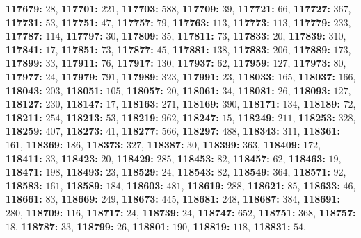 \textsf{\bfseries 117679:} $28$, \textsf{\bfseries 117701:} $221$, \textsf{\bfseries 117703:} $588$, \textsf{\bfseries 117709:} $39$, \textsf{\bfseries 117721:} $66$, \textsf{\bfseries 117727:} $367$, \textsf{\bfseries 117731:} $53$, \textsf{\bfseries 117751:} $47$, \textsf{\bfseries 117757:} $79$, \textsf{\bfseries 117763:} $113$, \textsf{\bfseries 117773:} $113$, \textsf{\bfseries 117779:} $233$, \textsf{\bfseries 117787:} $114$, \textsf{\bfseries 117797:} $30$, \textsf{\bfseries 117809:} $35$, \textsf{\bfseries 117811:} $73$, \textsf{\bfseries 117833:} $20$, \textsf{\bfseries 117839:} $310$, \textsf{\bfseries 117841:} $17$, \textsf{\bfseries 117851:} $73$, \textsf{\bfseries 117877:} $45$, \textsf{\bfseries 117881:} $138$, \textsf{\bfseries 117883:} $206$, \textsf{\bfseries 117889:} $173$, \textsf{\bfseries 117899:} $33$, \textsf{\bfseries 117911:} $76$, \textsf{\bfseries 117917:} $130$, \textsf{\bfseries 117937:} $62$, \textsf{\bfseries 117959:} $127$, \textsf{\bfseries 117973:} $80$, \textsf{\bfseries 117977:} $24$, \textsf{\bfseries 117979:} $791$, \textsf{\bfseries 117989:} $323$, \textsf{\bfseries 117991:} $23$, \textsf{\bfseries 118033:} $165$, \textsf{\bfseries 118037:} $166$, \textsf{\bfseries 118043:} $203$, \textsf{\bfseries 118051:} $105$, \textsf{\bfseries 118057:} $20$, \textsf{\bfseries 118061:} $34$, \textsf{\bfseries 118081:} $26$, \textsf{\bfseries 118093:} $127$, \textsf{\bfseries 118127:} $230$, \textsf{\bfseries 118147:} $17$, \textsf{\bfseries 118163:} $271$, \textsf{\bfseries 118169:} $390$, \textsf{\bfseries 118171:} $134$, \textsf{\bfseries 118189:} $72$, \textsf{\bfseries 118211:} $254$, \textsf{\bfseries 118213:} $53$, \textsf{\bfseries 118219:} $962$, \textsf{\bfseries 118247:} $15$, \textsf{\bfseries 118249:} $211$, \textsf{\bfseries 118253:} $328$, \textsf{\bfseries 118259:} $407$, \textsf{\bfseries 118273:} $41$, \textsf{\bfseries 118277:} $566$, \textsf{\bfseries 118297:} $488$, \textsf{\bfseries 118343:} $311$, \textsf{\bfseries 118361:} $161$, \textsf{\bfseries 118369:} $186$, \textsf{\bfseries 118373:} $327$, \textsf{\bfseries 118387:} $30$, \textsf{\bfseries 118399:} $363$, \textsf{\bfseries 118409:} $172$, \textsf{\bfseries 118411:} $33$, \textsf{\bfseries 118423:} $20$, \textsf{\bfseries 118429:} $285$, \textsf{\bfseries 118453:} $82$, \textsf{\bfseries 118457:} $62$, \textsf{\bfseries 118463:} $19$, \textsf{\bfseries 118471:} $198$, \textsf{\bfseries 118493:} $23$, \textsf{\bfseries 118529:} $24$, \textsf{\bfseries 118543:} $82$, \textsf{\bfseries 118549:} $364$, \textsf{\bfseries 118571:} $92$, \textsf{\bfseries 118583:} $161$, \textsf{\bfseries 118589:} $184$, \textsf{\bfseries 118603:} $481$, \textsf{\bfseries 118619:} $288$, \textsf{\bfseries 118621:} $85$, \textsf{\bfseries 118633:} $46$, \textsf{\bfseries 118661:} $83$, \textsf{\bfseries 118669:} $249$, \textsf{\bfseries 118673:} $445$, \textsf{\bfseries 118681:} $248$, \textsf{\bfseries 118687:} $384$, \textsf{\bfseries 118691:} $280$, \textsf{\bfseries 118709:} $116$, \textsf{\bfseries 118717:} $24$, \textsf{\bfseries 118739:} $24$, \textsf{\bfseries 118747:} $652$, \textsf{\bfseries 118751:} $368$, \textsf{\bfseries 118757:} $18$, \textsf{\bfseries 118787:} $33$, \textsf{\bfseries 118799:} $26$, \textsf{\bfseries 118801:} $190$, \textsf{\bfseries 118819:} $118$, \textsf{\bfseries 118831:} $54$, 
